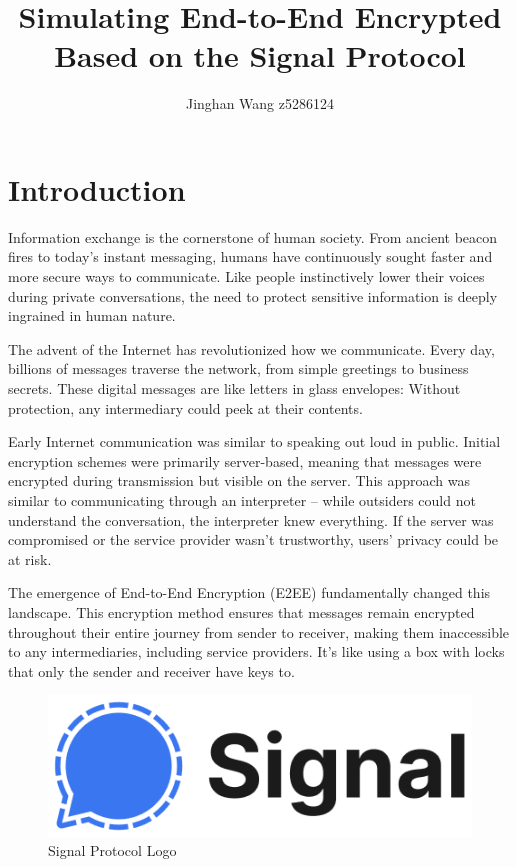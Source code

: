 \documentclass[9pt,a4paper,twoside]{rho-class/rho}
\title{Simulating End-to-End Encrypted Based on the Signal Protocol}
\author[1]{Jinghan Wang  z5286124}
\begin{document}
    \maketitle


\section{Introduction}

    Information exchange is the cornerstone of human society. From ancient beacon fires to today's instant messaging, humans have continuously sought faster and more secure ways to communicate. Like people instinctively lower their voices during private conversations, the need to protect sensitive information is deeply ingrained in human nature. 

    The advent of the Internet has revolutionized how we communicate. Every day, billions of messages traverse the network, from simple greetings to business secrets. These digital messages are like letters in glass envelopes: Without protection, any intermediary could peek at their contents.
    
    Early Internet communication was similar to speaking out loud in public. Initial encryption schemes were primarily server-based, meaning that messages were encrypted during transmission but visible on the server. This approach was similar to communicating through an interpreter – while outsiders could not understand the conversation, the interpreter knew everything. If the server was compromised or the service provider wasn't trustworthy, users' privacy could be at risk.
    
    The emergence of End-to-End Encryption (E2EE) fundamentally changed this landscape. This encryption method ensures that messages remain encrypted throughout their entire journey from sender to receiver, making them inaccessible to any intermediaries, including service providers. It's like using a box with locks that only the sender and receiver have keys to.

    \begin{figure}[H]
        \centering
        \includegraphics[width=0.71\columnwidth]{figures/logo.png}
        \caption{Signal Protocol Logo \cite{webteam@eso.org}}
        \label{fig:figure}
    \end{figure}
    
\end{document}
